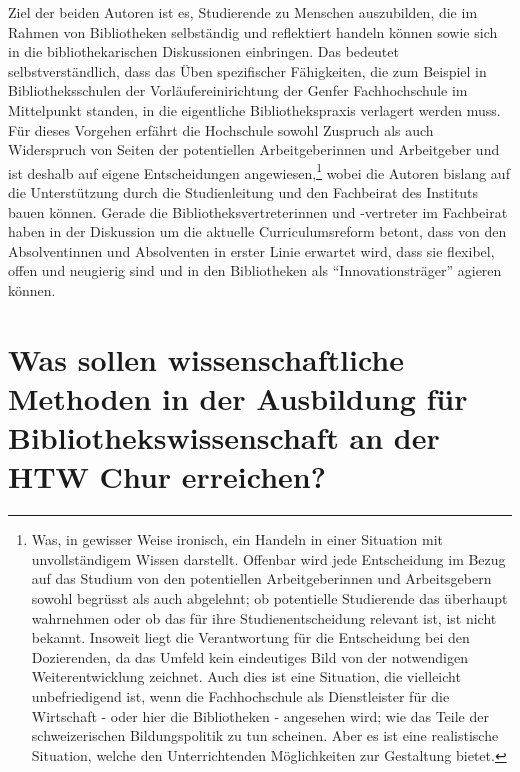 \documentclass[a4paper,
fontsize=11pt,
oneside,
numbers=noperiodatend,
parskip=half-,
bibliography=totoc,
final
]{scrartcl}
\begin{document}
Ziel der beiden Autoren ist es, Studierende zu Menschen auszubilden, die
im Rahmen von Bibliotheken selbständig und reflektiert handeln können
sowie sich in die bibliothekarischen Diskussionen einbringen. Das
bedeutet selbstverständlich, dass das Üben spezifischer Fähigkeiten, die
zum Beispiel in Bibliotheksschulen der Vorläufereinirichtung der Genfer
Fachhochschule im Mittelpunkt standen, in die eigentliche
Bibliothekspraxis verlagert werden muss. Für dieses Vorgehen erfährt die
Hochschule sowohl Zuspruch als auch Widerspruch von Seiten der
potentiellen Arbeitgeberinnen und Arbeitgeber und ist deshalb auf eigene
Entscheidungen angewiesen,\footnote{Was, in gewisser Weise ironisch, ein
  Handeln in einer Situation mit unvollständigem Wissen darstellt.
  Offenbar wird jede Entscheidung im Bezug auf das Studium von den
  potentiellen Arbeitgeberinnen und Arbeitsgebern sowohl begrüsst als
  auch abgelehnt; ob potentielle Studierende das überhaupt wahrnehmen
  oder ob das für ihre Studienentscheidung relevant ist, ist nicht
  bekannt. Insoweit liegt die Verantwortung für die Entscheidung bei den
  Dozierenden, da das Umfeld kein eindeutiges Bild von der notwendigen
  Weiterentwicklung zeichnet. Auch dies ist eine Situation, die
  vielleicht unbefriedigend ist, wenn die Fachhochschule als
  Dienstleister für die Wirtschaft - oder hier die Bibliotheken -
  angesehen wird; wie das Teile der schweizerischen Bildungspolitik zu
  tun scheinen. Aber es ist eine realistische Situation, welche den
  Unterrichtenden Möglichkeiten zur Gestaltung bietet.} wobei die
Autoren bislang auf die Unterstützung durch die Studienleitung und den
Fachbeirat des Instituts bauen können. Gerade die
Bibliotheksvertreterinnen und -vertreter im Fachbeirat haben in der
Diskussion um die aktuelle Curriculumsreform betont, dass von den
Absolventinnen und Absolventen in erster Linie erwartet wird, dass sie
flexibel, offen und neugierig sind und in den Bibliotheken als
\enquote{Innovationsträger} agieren können.

\section*{Was sollen wissenschaftliche Methoden in der Ausbildung
für Bibliothekswissenschaft an der HTW Chur
erreichen?}\label{was-sollen-wissenschaftliche-methoden-in-der-ausbildung-fuxfcr-bibliothekswissenschaft-an-der-htw-chur-erreichen}
\end{document}
